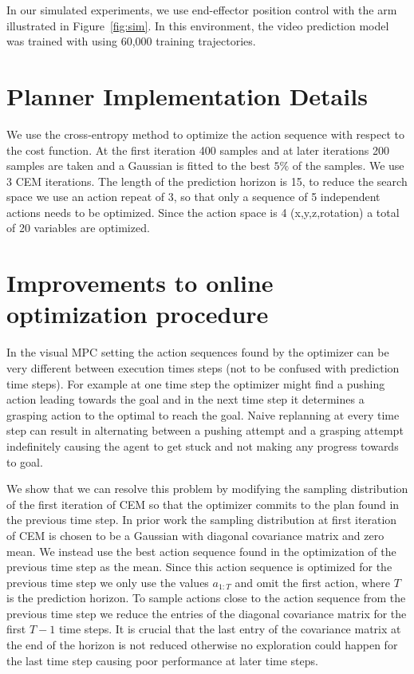 In our simulated experiments, we use end-effector position control with the arm illustrated in Figure~\ref{fig:sim}. In this environment, the video prediction model was trained with using 60,000 training trajectories.

\section*{Planner Implementation Details}

We use the cross-entropy method \cite{cem-rk-13} to optimize the action sequence with respect to the cost function. At the first iteration 400 samples and at later iterations 200 samples are taken and  a Gaussian is fitted to the best $5\%$ of the samples. We use 3 CEM iterations. The length of the prediction horizon is 15, to reduce the search space we use an action repeat of 3, so that only a sequence of 5 independent actions needs to be optimized. Since the action space is 4 (x,y,z,rotation) a total of 20 variables are optimized.

\section*{Improvements to online optimization procedure}
In the visual MPC setting the action sequences found by the optimizer can be very different between execution times steps (not to be confused with prediction time steps). For example at one time step the optimizer might find a pushing action leading towards the goal and in the next time step it determines a grasping action to the optimal to reach the goal. Naive replanning at every time step can result in alternating between a pushing attempt and a grasping attempt indefinitely causing the agent to get stuck and not making any progress towards to goal. 

We show that we can resolve this problem by modifying the sampling distribution of the first iteration of CEM so that the optimizer commits to the plan found in the previous time step. In prior work \cite{sna} the sampling distribution at first iteration of CEM is chosen to be a Gaussian with diagonal covariance matrix and zero mean. We instead use the best action sequence found in the optimization of the previous time step as the mean. Since this action sequence is optimized for the previous time step we only use the values $a_{1:T}$ and omit the first action, where $T$ is the prediction horizon. To sample actions close to the action sequence from the previous time step we reduce the entries of the diagonal covariance matrix for the first $T-1$ time steps. It is crucial that the last entry of the covariance matrix at the end of the horizon is not reduced otherwise no exploration could happen for the last time step causing poor performance at later time steps.